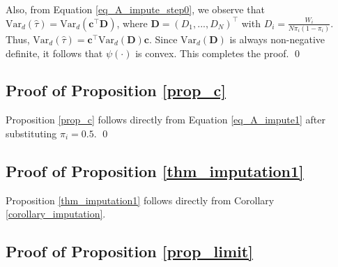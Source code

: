 \documentclass[12pt]{article}
\newcommand{\Var}{{\text{Var}}}
\begin{document}
Also, from Equation \ref{eq_A_impute_step0}, we observe that $\Var_d(\hat{\tau}) = \Var_d(\bm{c}^\top\bm{D})$, where $\bm{D} = (D_1,...,D_N)^\top$ with $D_i = \frac{W_i}{N\pi_i(1-\pi_i)}$. Thus, $\Var_d(\hat{\tau}) = \bm{c}^\top \Var_d(\bm{D}) \bm{c}$. Since $\Var_d(\bm{D})$ is always non-negative definite, it follows that $\psi(\cdot)$ is convex.
This completes the proof.
\qed
\subsection{Proof of Proposition \ref{prop_c}}

Proposition \ref{prop_c} follows directly from Equation \ref{eq_A_impute1} after substituting $\pi_i = 0.5$.
\qed

\subsection{Proof of Proposition \ref{thm_imputation1}}
Proposition \ref{thm_imputation1} follows directly from Corollary \ref{corollary_imputation}.

\subsection{Proof of Proposition \ref{prop_limit}}
\end{document}
